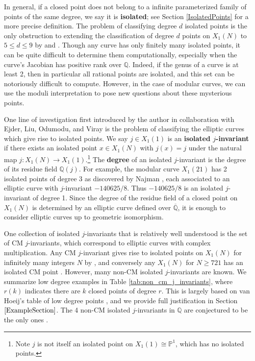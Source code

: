 \documentclass{amsart}
\theoremstyle{definition}
\newcommand{\Q}{\mathbb{Q}}
\begin{document}
In general, if a closed point does not belong to a infinite parameterized family of points of the same degree, we say it is \textbf{isolated}; see Section \ref{IsolatedPoints} for a more precise definition. The problem of classifying degree $d$ isolated points is the only obstruction to extending the classification of degree $d$ points on $X_1(N)$ to $5 \leq d \leq 9$ by \cite[Theorem 3]{DerickxVanHoeij2014} and \cite[Theorem 1.1]{NajmanVarivoda}. Though any curve has only finitely many isolated points, it can be quite difficult to determine them computationally, especially when the curve's Jacobian has positive rank over $\Q$. Indeed, if the genus of a curve is at least 2, then in particular all rational points are isolated, and this set can be notoriously difficult to compute. However, in the case of modular curves, we can use the moduli interpretation to pose new questions about these mysterious points.

One line of investigation first introduced by the author in collaboration with Ejder, Liu, Odumodu, and Viray \cite{BELOV} is the problem of classifying the elliptic curves which give rise to isolated points. We say $j\in X_1(1)$ is an \textbf{isolated $j$-invariant} if there exists an isolated point $x\in X_1(N)$ with $j(x)=j$ under the natural map $j:X_1(N) \rightarrow X_1(1)$.\footnote{Note $j$ is not itself an isolated point on $X_1(1) \cong \mathbb{P}^1$, which has no isolated points.} The \textbf{degree} of an isolated $j$-invariant is the degree of its residue field $\Q(j)$. For example, the modular curve $X_1(21)$ has 2 isolated points of degree 3 as discovered by Najman \cite{najman16}, each associated to an elliptic curve with $j$-invariant $-140625/8$. Thus $-140625/8$ is an isolated $j$-invariant of degree 1. Since the degree of the residue field of a closed point on $X_1(N)$ is determined by an elliptic curve defined over $\overline{\Q}$, it is enough to consider elliptic curves up to geometric isomorphism. 

 One collection of isolated $j$-invariants that is relatively well understood is the set of CM $j$-invariants, which correspond to elliptic curves with complex multiplication. Any CM $j$-invariant gives rise to isolated points on $X_1(N)$ for infinitely many integers $N$ by \cite[Theorem 7.1]{BELOV}, and conversely any $X_1(N)$ for $N\geq 721$ has an isolated CM point \cite[Theorem 8.2]{CGPS2022}. However, many non-CM isolated $j$-invariants are known. We summarize low degree examples in Table \ref{tab:non_cm_j_invariants}, where $r(k)$  indicates there are $k$ closed points of degree $r$. This is largely based on van Hoeij's table of low degree points \cite{vanHoeij}, and we provide full justification in Section $ \ref{ExampleSection}$. The 4 non-CM isolated $j$-invariants in $\Q$ are conjectured to be the only ones \cite{Algorithm2025,TeraoX1}.
\end{document}
